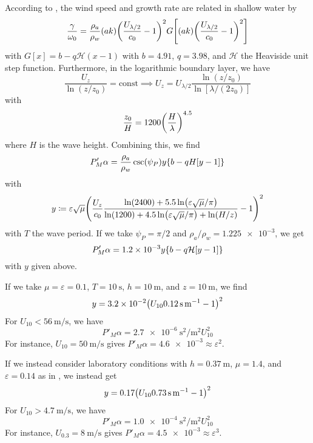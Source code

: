 \documentclass{jfm}
\renewcommand*{\epsilon}{\varepsilon}
\begin{document}
According to \citet{donelan2006wave}, the wind speed and growth rate
are related in shallow water by
\begin{equation}
  \frac{\gamma}{\omega_0} = \frac{\rho_a}{\rho_w} (ak)
  \pqty{\frac{U_{\lambda/2}}{c_0} - 1}^2
  G \bqty{(ak)
  \pqty{\frac{U_{\lambda/2}}{c_0} - 1}^2}
\end{equation}
with $G[x] = b - q \mathcal{H}(x - 1)$ with $b = 4.91$, $q = 3.98$, and
$\mathcal{H}$ the Heaviside unit step function.
Furthermore, in the logarithmic boundary layer, we have
\begin{equation}
  \frac{U_z}{\ln(z/z_0)} = \text{const}
  \implies U_{z} = U_{\lambda/2} \frac{\ln(z/z_0)}{\ln[\lambda/(2 z_0)]}
\end{equation}
with \citep{taylor2001dependence}
\begin{equation}
  \frac{z_0}{H} = 1200 \pqty{\frac{H}{\lambda}}^{4.5}
\end{equation}
where $H$ is the wave height.
Combining this, we find
\begin{equation}
  P'_M \alpha = \frac{\rho_a}{\rho_w} \csc(\psi_P)
  y \Bqty{b-qH[y - 1]}
\end{equation}
with
\begin{equation}
  y \coloneqq
  \epsilon \sqrt{\mu}
  \pqty{\frac{U_{z}}{c_0} \frac{\ln(2400)+5.5\ln(\epsilon \sqrt{\mu}/\pi)}
    {\ln(1200) + 4.5 \ln(\epsilon \sqrt{\mu}/\pi) + \ln(H/z)} - 1}^2
\end{equation}
with $T$ the wave period.
If we take $\psi_P = \pi/2$ and $\rho_a/\rho_w = \num{1.225e-3}$, we get
\begin{equation}
  P'_M \alpha = \num{1.2e-3} y \Bqty{b-q \mathcal{H}[y - 1]}
\end{equation}
with $y$ given above.

If we take $\mu = \epsilon = 0.1$, $T = \SI{10}{\second}$, $h =
\SI{10}{\meter}$, and $z = \SI{10}{\meter}$, we find
\begin{equation}
  y = \num{3.2e-2} \pqty{U_{10} \SI{0.12}{\second\per\meter} - 1}^2
\end{equation}
For $U_{10} < \SI{56}{\meter\per\second}$, we have
\begin{equation}
  P'_M \alpha = \SI{2.7e-6}{\second\squared\per\meter\squared} U_{10}^2
\end{equation}
For instance, $U_{10} = \SI{50}{\meter\per\second}$ gives
$P'_M \alpha = \num{4.6e-3} \approx \epsilon^2$.

If we instead consider laboratory conditions with $h=\SI{0.37}{\meter}$,
$\mu = 1.4$, and $\epsilon = 0.14$ as in \citet{feddersen2005wind}, we
instead get
\begin{equation}
  y = \num{0.17} \pqty{U_{10} \SI{0.73}{\second\per\meter} - 1}^2
\end{equation}
For $U_{10} > \SI{4.7}{\meter\per\second}$, we have
\begin{equation}
  P'_M \alpha = \SI{1.0e-4}{\second\squared\per\meter\squared} U_{10}^2
\end{equation}
For instance, $U_{0.3} = \SI{8}{\meter\per\second}$ gives
$P'_M \alpha = \num{4.5e-3} \approx \epsilon^3$.
\end{document}
